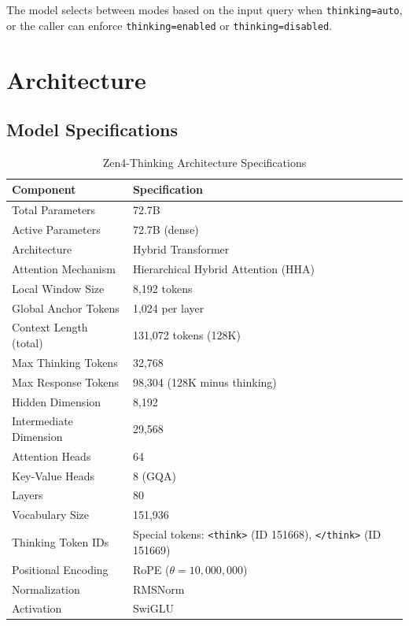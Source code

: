 \documentclass[11pt,a4paper]{article}
\begin{document}
The model selects between modes based on the input query when \texttt{thinking=auto},
or the caller can enforce \texttt{thinking=enabled} or \texttt{thinking=disabled}.

\section{Architecture}

\subsection{Model Specifications}

\begin{table}[H]
\centering
\begin{tabular}{ll}
\toprule
\textbf{Component} & \textbf{Specification} \\
\midrule
Total Parameters          & 72.7B \\
Active Parameters         & 72.7B (dense) \\
Architecture              & Hybrid Transformer \\
Attention Mechanism       & Hierarchical Hybrid Attention (HHA) \\
Local Window Size         & 8,192 tokens \\
Global Anchor Tokens      & 1,024 per layer \\
Context Length (total)    & 131,072 tokens (128K) \\
Max Thinking Tokens       & 32,768 \\
Max Response Tokens       & 98,304 (128K minus thinking) \\
Hidden Dimension          & 8,192 \\
Intermediate Dimension    & 29,568 \\
Attention Heads           & 64 \\
Key-Value Heads           & 8 (GQA) \\
Layers                    & 80 \\
Vocabulary Size           & 151,936 \\
Thinking Token IDs        & Special tokens: \texttt{<think>} (ID 151668), \texttt{</think>} (ID 151669) \\
Positional Encoding       & RoPE ($\theta = 10{,}000{,}000$) \\
Normalization             & RMSNorm \\
Activation                & SwiGLU \\
\bottomrule
\end{tabular}
\caption{Zen4-Thinking Architecture Specifications}
\end{table}
\end{document}
